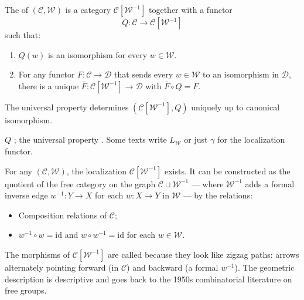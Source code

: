\begin{definition}[Localization]
\label{def:localization}
The  of $(\mathcal{C}, \mathcal{W})$ is a category
$\mathcal{C}[\mathcal{W}^{-1}]$ together with a functor
\begin{equation*}
  Q : \mathcal{C} \to \mathcal{C}[\mathcal{W}^{-1}]
\end{equation*}
such that:
\begin{enumerate}
  \item $Q(w)$ is an isomorphism for every $w \in \mathcal{W}$.
  \item For any functor $F : \mathcal{C} \to \mathcal{D}$ that sends
        every $w \in \mathcal{W}$ to an isomorphism in $\mathcal{D}$,
        there is a unique $\bar F : \mathcal{C}[\mathcal{W}^{-1}] \to
        \mathcal{D}$ with $\bar F \circ Q = F$.
\end{enumerate}
The universal property determines $(\mathcal{C}[\mathcal{W}^{-1}], Q)$
uniquely up to canonical isomorphism.
\end{definition}

\begin{howtosay}
$Q$ ; the
universal property . Some texts write $L_\mathcal{W}$ or just
$\gamma$ for the localization functor.
\end{howtosay}

\begin{theorem}
\label{thm:gz-construction}
For any $(\mathcal{C}, \mathcal{W})$, the localization
$\mathcal{C}[\mathcal{W}^{-1}]$ exists. It can be constructed as the
quotient of the free category on the graph $\mathcal{C} \sqcup
\mathcal{W}^{-1}$ — where $\mathcal{W}^{-1}$ adds a formal inverse edge
$w^{-1} : Y \to X$ for each $w : X \to Y$ in $\mathcal{W}$ — by the
relations:
\begin{itemize}
  \item Composition relations of $\mathcal{C}$;
  \item $w^{-1} \circ w = \mathrm{id}$ and $w \circ w^{-1} = \mathrm{id}$
        for each $w \in \mathcal{W}$.
\end{itemize}
\end{theorem}

\begin{nameorigin}
The morphisms of $\mathcal{C}[\mathcal{W}^{-1}]$ are called 
because they look like zigzag paths: arrows alternately pointing forward
(in $\mathcal{C}$) and backward (a formal $w^{-1}$). The geometric
description is descriptive and goes back to the 1950s combinatorial
literature on free groups.
\end{nameorigin}

